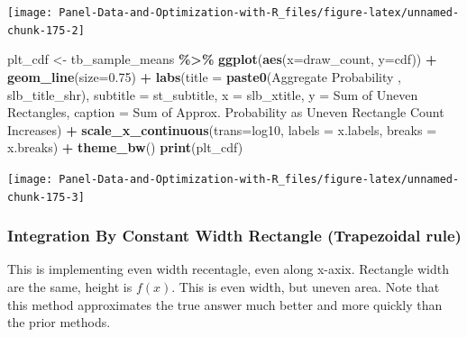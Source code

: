 \documentclass[
]{book}
\newenvironment{Shaded}{\begin{snugshade}}{\end{snugshade}}
\newcommand{\DataTypeTok}[1]{\textcolor[rgb]{0.13,0.29,0.53}{#1}}
\newcommand{\FloatTok}[1]{\textcolor[rgb]{0.00,0.00,0.81}{#1}}
\newcommand{\KeywordTok}[1]{\textcolor[rgb]{0.13,0.29,0.53}{\textbf{#1}}}
\newcommand{\NormalTok}[1]{#1}
\newcommand{\OperatorTok}[1]{\textcolor[rgb]{0.81,0.36,0.00}{\textbf{#1}}}
\newcommand{\StringTok}[1]{\textcolor[rgb]{0.31,0.60,0.02}{#1}}
\begin{document}
\begin{center}\texttt{[image: Panel-Data-and-Optimization-with-R\_files/figure-latex/unnamed-chunk-175-2]} \end{center}

\begin{Shaded}
\begin{Highlighting}[]
\NormalTok{plt\_cdf \textless{}{-}}\StringTok{ }\NormalTok{tb\_sample\_means }\OperatorTok{\%\textgreater{}\%}
\StringTok{  }\KeywordTok{ggplot}\NormalTok{(}\KeywordTok{aes}\NormalTok{(}\DataTypeTok{x=}\NormalTok{draw\_count, }\DataTypeTok{y=}\NormalTok{cdf)) }\OperatorTok{+}
\StringTok{  }\KeywordTok{geom\_line}\NormalTok{(}\DataTypeTok{size=}\FloatTok{0.75}\NormalTok{) }\OperatorTok{+}
\StringTok{  }\KeywordTok{labs}\NormalTok{(}\DataTypeTok{title =} \KeywordTok{paste0}\NormalTok{(}\StringTok{\textquotesingle{}Aggregate Probability \textquotesingle{}}\NormalTok{, slb\_title\_shr),}
       \DataTypeTok{subtitle =}\NormalTok{ st\_subtitle,}
       \DataTypeTok{x =}\NormalTok{ slb\_xtitle,}
       \DataTypeTok{y =} \StringTok{\textquotesingle{}Sum of Uneven Rectangles\textquotesingle{}}\NormalTok{,}
       \DataTypeTok{caption =} \StringTok{\textquotesingle{}Sum of Approx. Probability as Uneven Rectangle Count Increases\textquotesingle{}}\NormalTok{) }\OperatorTok{+}
\StringTok{  }\KeywordTok{scale\_x\_continuous}\NormalTok{(}\DataTypeTok{trans=}\StringTok{\textquotesingle{}log10\textquotesingle{}}\NormalTok{, }\DataTypeTok{labels =}\NormalTok{ x.labels, }\DataTypeTok{breaks =}\NormalTok{ x.breaks) }\OperatorTok{+}
\StringTok{  }\KeywordTok{theme\_bw}\NormalTok{()}
\KeywordTok{print}\NormalTok{(plt\_cdf)}
\end{Highlighting}
\end{Shaded}

\begin{center}\texttt{[image: Panel-Data-and-Optimization-with-R\_files/figure-latex/unnamed-chunk-175-3]} \end{center}

\hypertarget{integration-by-constant-width-rectangle-trapezoidal-rule}{%
\subsubsection{Integration By Constant Width Rectangle (Trapezoidal rule)}\label{integration-by-constant-width-rectangle-trapezoidal-rule}}

This is implementing even width recentagle, even along x-axix. Rectangle width are the same, height is \(f(x)\). This is even width, but uneven area. Note that this method approximates the true answer much better and more quickly than the prior methods.
\end{document}
